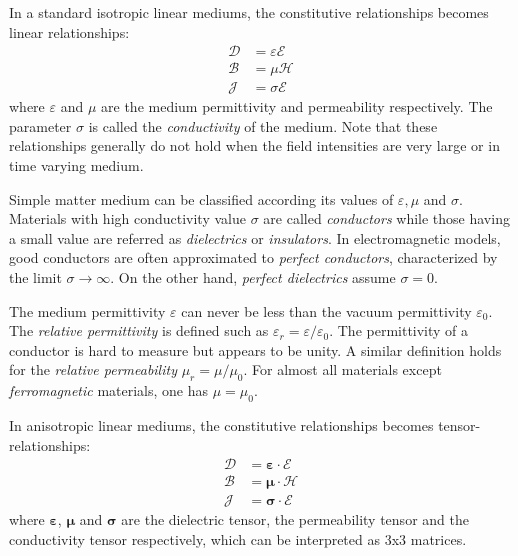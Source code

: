 In a standard isotropic linear mediums, the constitutive relationships becomes linear relationships:
\begin{subequations}
 \begin{align}
  \boldsymbol{\mathcal{D}} &= \varepsilon \boldsymbol{\mathcal{E}} \\
  \boldsymbol{\mathcal{B}} &= \mu \boldsymbol{\mathcal{H}} \\
  \boldsymbol{\mathcal{J}} &= \sigma \boldsymbol{\mathcal{E}}
 \end{align}
\end{subequations}
where $\varepsilon$ and $\mu$ are the medium permittivity and permeability respectively. The parameter $\sigma$ is called the \emph{conductivity} of the medium. Note that these relationships generally do not hold when the field intensities are very large or in time varying medium.

Simple matter medium can be classified according its values of $\varepsilon, \mu$ and $\sigma$. Materials with high conductivity value $\sigma$ are called \emph{conductors} while those having a small value are referred as \emph{dielectrics} or \emph{insulators}. In electromagnetic models, good conductors are often approximated to \emph{perfect conductors}, characterized by the limit $\sigma\to\infty$. On the other hand, \emph{perfect dielectrics} assume $\sigma=0$. 

The medium permittivity $\varepsilon$ can never be less than the vacuum permittivity $\varepsilon_0$. The \emph{relative permittivity} is defined such as $\varepsilon_r=\varepsilon/\varepsilon_0$. The permittivity of a conductor is hard to measure but appears to be unity\parencite{Harrington2001}. A similar definition holds for the \emph{relative permeability} $\mu_r=\mu/\mu_0$. For almost all materials except \emph{ferromagnetic} materials, one has $\mu=\mu_0$.

In anisotropic linear mediums, the constitutive relationships becomes tensor-relationships:
\begin{subequations}
 \begin{align}
  \boldsymbol{\mathcal{D}} &= \boldsymbol{\varepsilon} \cdot \boldsymbol{\mathcal{E}} \\
  \boldsymbol{\mathcal{B}} &= \boldsymbol{\mu} \cdot  \boldsymbol{\mathcal{H}} \\
  \boldsymbol{\mathcal{J}} &= \boldsymbol{\sigma} \cdot  \boldsymbol{\mathcal{E}}
 \end{align}
\end{subequations}
where $\boldsymbol{\varepsilon}$, $\boldsymbol{\mu}$ and $\boldsymbol{\sigma}$ are the dielectric tensor, the permeability tensor and the conductivity tensor respectively, which can be interpreted as 3x3 matrices\parencite{Swanson2003}.  

